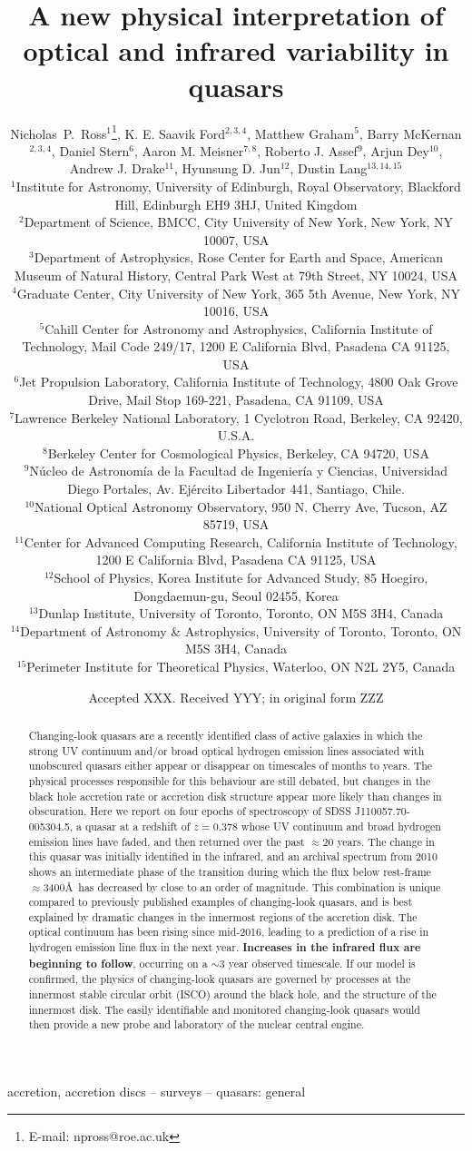 \documentclass[a4paper,fleqn,usenatbib]{mnras}
\title[Variability in J1100-0053]{A new physical interpretation of optical and infrared variability in quasars}
\author[N.P. Ross et al.]
{Nicholas~P.~Ross$^{1}$\thanks{E-mail: npross@roe.ac.uk},    
K. E. Saavik Ford$^{2,3,4}$,  Matthew Graham$^{5}$,  Barry McKernan$^{2,3,4}$,  
\newauthor Daniel Stern$^{6}$, Aaron M. Meisner$^{7,8}$, Roberto J. Assef$^{9}$, 
Arjun Dey$^{10}$, Andrew J. Drake$^{11}$, 
\newauthor Hyunsung D. Jun$^{12}$, Dustin Lang$^{13,14,15}$
\\
$^{1}$Institute for Astronomy, University of Edinburgh, Royal Observatory, Blackford Hill, Edinburgh EH9 3HJ, United Kingdom \\
$^{2}$Department of Science, BMCC, City University of New York, New York, NY 10007, USA \\
$^{3}$Department of Astrophysics, Rose Center for Earth and Space, American Museum of Natural History, Central Park West at 79th Street, NY 10024, USA \\
$^{4}$Graduate Center, City University of New York, 365 5th Avenue, New York, NY 10016, USA\\
$^{5}$Cahill Center for Astronomy and Astrophysics, California Institute of Technology, Mail Code 249/17, 1200 E California Blvd, Pasadena CA 91125, USA\\
$^{6}$Jet Propulsion Laboratory, California Institute of Technology, 4800 Oak Grove Drive, Mail Stop 169-221, Pasadena, CA 91109, USA \\
$^{7}$Lawrence Berkeley National Laboratory, 1 Cyclotron Road, Berkeley, CA 92420, U.S.A. \\
$^{8}$Berkeley Center for Cosmological Physics, Berkeley, CA 94720, USA\\
$^{9}$N\'ucleo de Astronom\'ia de la Facultad de Ingenier\'ia y Ciencias, Universidad Diego Portales, Av. Ej\'ercito Libertador 441, Santiago, Chile.\\
$^{10}$National Optical Astronomy Observatory, 950 N. Cherry Ave, Tucson, AZ 85719, USA \\
$^{11}$Center for Advanced Computing Research, California Institute of Technology, 1200 E California Blvd, Pasadena CA 91125, USA \\
$^{12}$School of Physics, Korea Institute for Advanced Study, 85 Hoegiro, Dongdaemun-gu, Seoul 02455, Korea\\
$^{13}$Dunlap Institute, University of Toronto, Toronto, ON M5S 3H4, Canada \\
$^{14}$Department of Astronomy \& Astrophysics, University of Toronto, Toronto, ON M5S 3H4, Canada \\
$^{15}$Perimeter Institute for Theoretical Physics, Waterloo, ON N2L 2Y5, Canada\\
}
\date{Accepted XXX. Received YYY; in original form ZZZ}
\begin{document}
\label{firstpage}
\pagerange{\pageref{firstpage}--\pageref{lastpage}}
\maketitle


\begin{abstract}
Changing-look quasars are a recently identified class of active
galaxies in which the strong UV continuum and/or broad optical
hydrogen emission lines associated with unobscured quasars either
appear or disappear on timescales of months to years.  The physical
processes responsible for this behaviour are still debated, but
changes in the black hole accretion rate or accretion disk structure
appear more likely than changes in obscuration.  Here we report on
four epochs of spectroscopy of SDSS J110057.70-005304.5, a quasar at a
redshift of $z=0.378$ whose UV continuum and broad hydrogen emission
lines have faded, and then returned over the past $\approx$20
years. The change in this quasar was initially identified in the
infrared, and an archival spectrum from 2010 shows an intermediate
phase of the transition during which the flux below rest-frame
$\approx$3400\AA\ has decreased by close to an order of magnitude. This
combination is unique compared to previously published examples of
changing-look quasars, and is best explained by dramatic changes in
the innermost regions of the accretion disk. The optical continuum has
been rising since mid-2016, leading to a prediction of a rise in
hydrogen emission line flux in the next year. {\bf Increases in the
infrared flux are beginning to follow}, occurring on a $\sim$3 year observed
timescale. If our model is confirmed, the physics of changing-look
quasars are governed by processes at the innermost stable circular
orbit (ISCO) around the black hole, and the structure of the innermost
disk. The easily identifiable and monitored changing-look quasars
would then provide a new probe and laboratory of the nuclear central
engine.
\end{abstract}

\begin{keywords}
accretion, accretion discs -- surveys -- quasars: general
\end{keywords}




\end{document}

